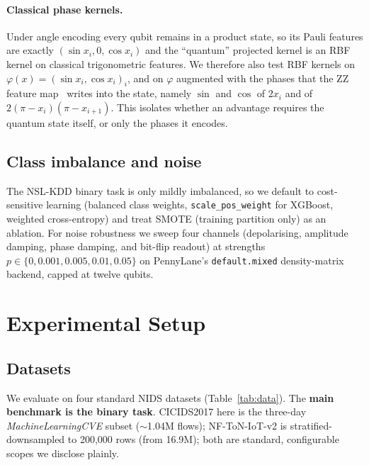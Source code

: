 \documentclass[preprint,11pt]{elsarticle}
\begin{document}
\paragraph{Classical phase kernels.} Under angle encoding every qubit remains in a product state, so its
Pauli features are exactly $(\sin x_i, 0, \cos x_i)$ and the ``quantum'' projected kernel is an RBF kernel
on classical trigonometric features. We therefore also test RBF kernels on
$\varphi(x)=(\sin x_i,\cos x_i)_{i}$, and on $\varphi$ augmented with the phases that the ZZ feature
map~\cite{havlicek2019supervised} writes into the state, namely $\sin$ and $\cos$ of $2x_i$ and of
$2(\pi-x_i)(\pi-x_{i+1})$. This isolates whether an advantage requires the quantum state itself, or only
the phases it encodes.

\subsection{Class imbalance and noise}
The NSL-KDD binary task is only mildly imbalanced, so we default to cost-sensitive learning (balanced
class weights, \texttt{scale\_pos\_weight} for XGBoost, weighted cross-entropy) and treat SMOTE
(training partition only) as an ablation. For noise robustness we sweep four channels (depolarising,
amplitude damping, phase damping, and bit-flip readout) at strengths $p\in\{0,0.001,0.005,0.01,0.05\}$
on PennyLane's \texttt{default.mixed} density-matrix backend, capped at twelve qubits.

\section{Experimental Setup}
\subsection{Datasets}
We evaluate on four standard NIDS datasets (Table~\ref{tab:data}). The \textbf{main benchmark is the
binary task}. CICIDS2017 here is the three-day \emph{MachineLearningCVE} subset ($\sim$1.04M flows);
NF-ToN-IoT-v2 is stratified-downsampled to 200{,}000 rows (from 16.9M); both are standard, configurable
scopes we disclose plainly.
\end{document}
